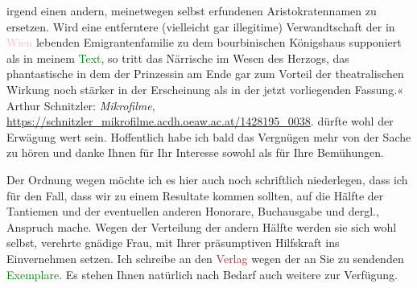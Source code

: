 {{{                     irgend einen andern, meinetwegen selbst erfundenen Aristokratennamen zu ersetzen. Wird
                     eine entferntere \introOben{}(\introOben{}vielleicht gar illegitime\introOben{})\introOben{}
                     Verwandtschaft der in \textcolor{pink}{Wien} lebenden Emigrantenfamilie zu dem bourbinischen Königshaus
                     supponiert als in meinem \textcolor{green}{Text}, so tritt das
                     Närrische im Wesen des Herzogs, das phantastische in dem der Prinzessin am Ende gar zum Vorteil der theatralischen Wirkung noch
                     stärker in der Erscheinung als in der jetzt
                     vorliegenden Fassung.« Arthur Schnitzler: \emph{Mikrofilme}, \url{https://schnitzler\_mikrofilme.acdh.oeaw.ac.at/1428195\_0038}.}}}\label{K_L03950-2} dürfte wohl der Erwägung wert sein. Hoffentlich habe ich bald das
               Vergnügen mehr von der Sache zu hören und danke Ihnen für Ihr Interesse sowohl als
               für Ihre Bemühungen.\pend
           
\pstart
           Der Ordnung wegen möchte ich es hier auch noch schriftlich niederlegen, dass ich für
               den Fall, dass wir zu einem Resultate kommen sollten, auf die Hälfte der Tantiemen
               und der eventuellen anderen Honorare, Buchausgabe und dergl., Anspruch mache. Wegen
               der Verteilung der andern Hälfte werden sie sich wohl selbst, verehrte gnädige Frau,
               mit Ihrer präsumptiven Hilfskraft ins Einvernehmen setzen. Ich schreibe an den \textcolor{brown}{Verlag}\ledrightnote{{$\rightarrow$}\emph{\textcolor{brown}{S. Fischer Verlag}}} wegen der an Sie zu
               sendenden \textcolor{green}{Exemplare}\ledrightnote{{$\rightarrow$}\emph{\textcolor{green}{Der junge Medardus. Dramatische Historie in einem Vorspiel und fünf Aufzügen}}}. Es stehen
               Ihnen natürlich nach Bedarf auch weitere zur Verfügung.\pend
           
